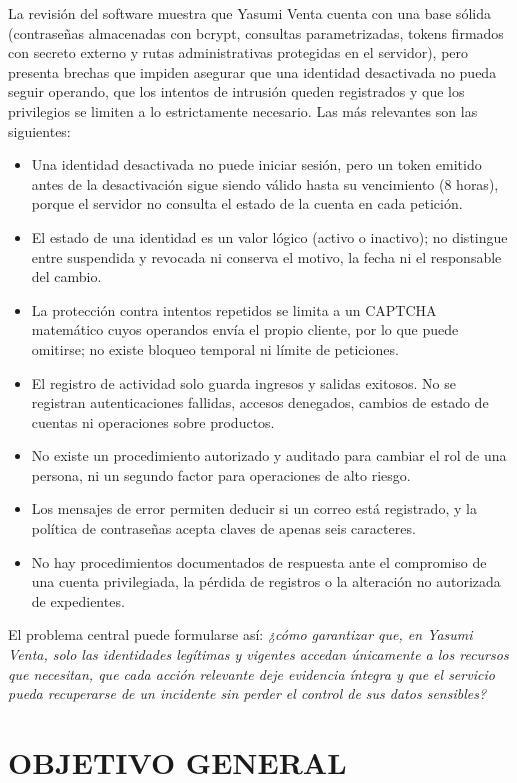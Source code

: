 \documentclass[12pt,letterpaper]{article}
\begin{document}
La revisión del software muestra que Yasumi Venta cuenta con una base sólida (contraseñas almacenadas con bcrypt, consultas parametrizadas, tokens firmados con secreto externo y rutas administrativas protegidas en el servidor), pero presenta brechas que impiden asegurar que una identidad desactivada no pueda seguir operando, que los intentos de intrusión queden registrados y que los privilegios se limiten a lo estrictamente necesario. Las más relevantes son las siguientes:

\begin{itemize}
  \item Una identidad desactivada no puede iniciar sesión, pero un token emitido antes de la desactivación sigue siendo válido hasta su vencimiento (8 horas), porque el servidor no consulta el estado de la cuenta en cada petición.
  \item El estado de una identidad es un valor lógico (activo o inactivo); no distingue entre suspendida y revocada ni conserva el motivo, la fecha ni el responsable del cambio.
  \item La protección contra intentos repetidos se limita a un CAPTCHA matemático cuyos operandos envía el propio cliente, por lo que puede omitirse; no existe bloqueo temporal ni límite de peticiones.
  \item El registro de actividad solo guarda ingresos y salidas exitosos. No se registran autenticaciones fallidas, accesos denegados, cambios de estado de cuentas ni operaciones sobre productos.
  \item No existe un procedimiento autorizado y auditado para cambiar el rol de una persona, ni un segundo factor para operaciones de alto riesgo.
  \item Los mensajes de error permiten deducir si un correo está registrado, y la política de contraseñas acepta claves de apenas seis caracteres.
  \item No hay procedimientos documentados de respuesta ante el compromiso de una cuenta privilegiada, la pérdida de registros o la alteración no autorizada de expedientes.
\end{itemize}

El problema central puede formularse así: \textit{¿cómo garantizar que, en Yasumi Venta, solo las identidades legítimas y vigentes accedan únicamente a los recursos que necesitan, que cada acción relevante deje evidencia íntegra y que el servicio pueda recuperarse de un incidente sin perder el control de sus datos sensibles?}

\section{OBJETIVO GENERAL}
\end{document}
